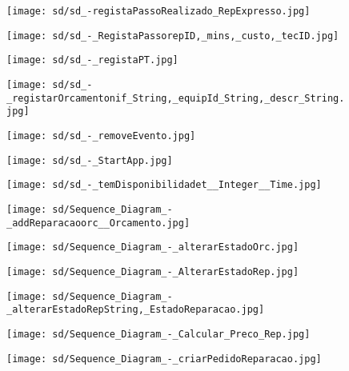 \documentclass[relatorio.tex]{subfiles}
\begin{document}
\begin{landscape}
\begin{figure} \centering \texttt{[image: sd/sd\_-registaPassoRealizado\_RepExpresso.jpg]} \end{figure}
\begin{figure} \centering \texttt{[image: sd/sd\_-\_RegistaPassorepID,\_mins,\_custo,\_tecID.jpg]} \end{figure}
\begin{figure} \centering \texttt{[image: sd/sd\_-\_registaPT.jpg]} \end{figure}
\begin{figure} \centering \texttt{[image: sd/sd\_-\_registarOrcamentonif\_String,\_equipId\_String,\_descr\_String.jpg]} \end{figure}
\begin{figure} \centering \texttt{[image: sd/sd\_-\_removeEvento.jpg]} \end{figure}
\begin{figure} \centering \texttt{[image: sd/sd\_-\_StartApp.jpg]} \end{figure}
\begin{figure} \centering \texttt{[image: sd/sd\_-\_temDisponibilidadet\_\_Integer\_\_Time.jpg]} \end{figure}
\begin{figure} \centering \texttt{[image: sd/Sequence\_Diagram\_-\_addReparacaoorc\_\_Orcamento.jpg]} \end{figure}
\begin{figure} \centering \texttt{[image: sd/Sequence\_Diagram\_-\_alterarEstadoOrc.jpg]} \end{figure}
\begin{figure} \centering \texttt{[image: sd/Sequence\_Diagram\_-\_AlterarEstadoRep.jpg]} \end{figure}
\begin{figure} \centering \texttt{[image: sd/Sequence\_Diagram\_-\_alterarEstadoRepString,\_EstadoReparacao.jpg]} \end{figure}
\begin{figure} \centering \texttt{[image: sd/Sequence\_Diagram\_-\_Calcular\_Preco\_Rep.jpg]} \end{figure}
\begin{figure} \centering \texttt{[image: sd/Sequence\_Diagram\_-\_criarPedidoReparacao.jpg]} \end{figure}
\end{landscape}
\end{document}
